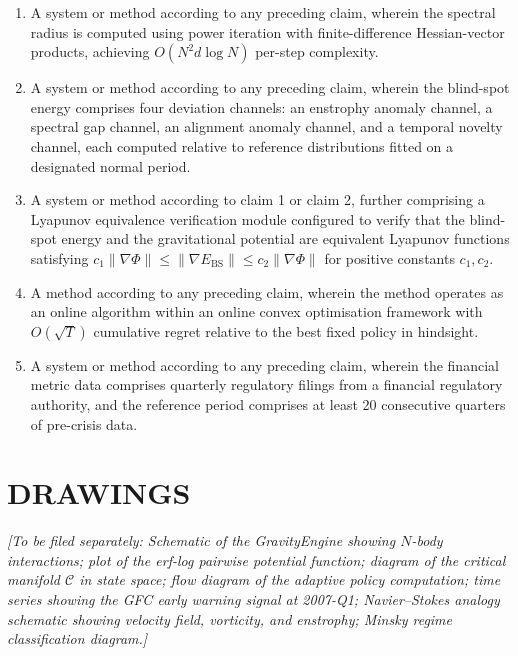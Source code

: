 \documentclass[12pt,a4paper]{article}
\begin{document}
\begin{enumerate}[label=\textbf{\arabic*.}]
\item A system or method according to any preceding claim, wherein the 
spectral radius is computed using power iteration with finite-difference 
Hessian-vector products, achieving $O(N^2 d \log N)$ per-step complexity.

\item A system or method according to any preceding claim, wherein the 
blind-spot energy comprises four deviation channels: an enstrophy anomaly 
channel, a spectral gap channel, an alignment anomaly channel, and a 
temporal novelty channel, each computed relative to reference distributions 
fitted on a designated normal period.

\item A system or method according to claim 1 or claim 2, further 
comprising a Lyapunov equivalence verification module configured to verify 
that the blind-spot energy and the gravitational potential are equivalent 
Lyapunov functions satisfying 
$c_1\|\nabla\Phi\| \leq \|\nabla E_{\text{BS}}\| \leq c_2\|\nabla\Phi\|$
for positive constants $c_1, c_2$.

\item A method according to any preceding claim, wherein the method 
operates as an online algorithm within an online convex optimisation 
framework with $O(\sqrt{T})$ cumulative regret relative to the best 
fixed policy in hindsight.

\item A system or method according to any preceding claim, wherein the 
financial metric data comprises quarterly regulatory filings from a 
financial regulatory authority, and the reference period comprises at 
least 20 consecutive quarters of pre-crisis data.

\end{enumerate}

\section{DRAWINGS}

\textit{[To be filed separately: Schematic of the GravityEngine showing 
$N$-body interactions; plot of the erf-log pairwise potential function; 
diagram of the critical manifold $\mathcal{C}$ in state space; flow diagram 
of the adaptive policy computation; time series showing the GFC early 
warning signal at 2007-Q1; Navier--Stokes analogy schematic showing 
velocity field, vorticity, and enstrophy; Minsky regime classification 
diagram.]}
\end{document}
